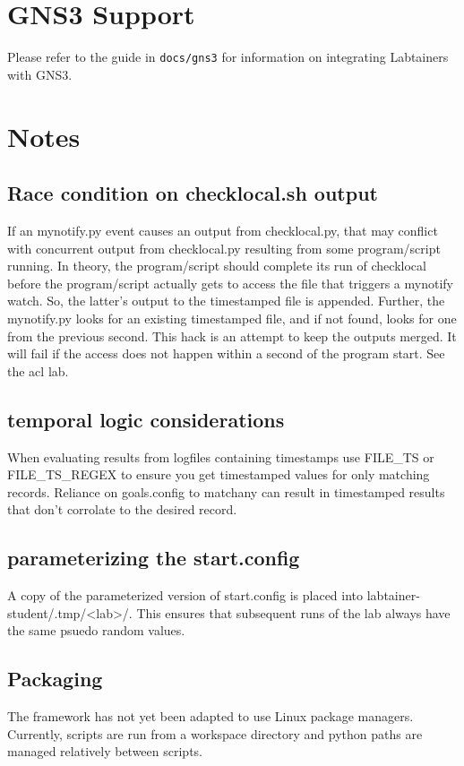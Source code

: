 \documentclass[12pt]{article}
\begin{document}
\section{GNS3 Support}
Please refer to the guide in {\tt docs/gns3} for information on integrating Labtainers with GNS3.

\section {Notes}
\subsection {Race condition on checklocal.sh output}
If an mynotify.py event causes an output from checklocal.py, that may conflict with
concurrent output from checklocal.py resulting from some program/script running.  In 
theory, the program/script should complete its run of checklocal before the program/script
actually gets to access the file that triggers a mynotify watch.  So, the latter's output
to the timestamped file is appended.  Further, the mynotify.py looks for an existing timestamped
file, and if not found, looks for one from the previous second.  This hack is an attempt to
keep the outputs merged.  It will fail if the access does not happen within a second of the
program start.  See the acl lab.

\subsection {temporal logic considerations}
When evaluating results from logfiles containing timestamps use FILE\_TS or FILE\_TS\_REGEX
to ensure you get timestamped values for only matching records. Reliance on goals.config to
matchany can result in timestamped results that don't corrolate to the desired record. 

\subsection {parameterizing the start.config}
A copy of the parameterized version of start.config is placed into 
labtainer-student/.tmp/<lab>/.  This ensures that subsequent runs of the lab always
have the same psuedo random values.

\subsection {Packaging}
The framework has not yet been adapted to use Linux package managers.
Currently, scripts are run from a workspace directory and python
paths are managed relatively between scripts.  
\end{document}
